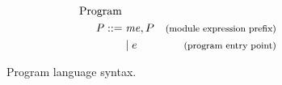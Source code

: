 \begin{figure}[!htb]
\captionsetup{skip=0pt}
\begin{align*}
\begin{aligned}
\text{Program } \\
\mathit{P} ::= \; & \mathit{me}, P & \footnotesize\text{(module expression prefix)}\\
&|\; e & \footnotesize\text{(program entry point)}
\end{aligned}
\end{align*}
\caption[Syntax: Program Language]{Program language syntax. \label{fig:ProgramSyntax}}
\end{figure}
